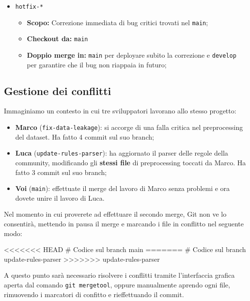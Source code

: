 \documentclass[12pt]{article}
\begin{document}
\begin{samepage}
\begin{itemize}
\begin{itemize}
\end{itemize}
\item \texttt{hotfix-*}
\begin{itemize}
\item \textbf{Scopo:} Correzione immediata di bug critici trovati nel \texttt{main};
\item \textbf{Checkout da:} \texttt{main}
\item \textbf{Doppio merge in:} \texttt{main} per deployare subito la correzione e \texttt{develop} per garantire che il bug non riappaia in futuro;
\end{itemize}
\end{itemize}
\end{samepage}

\newpage
\subsection{Gestione dei conflitti}
Immaginiamo un contesto in cui tre sviluppatori lavorano allo stesso progetto:
\begin{itemize}
\item \textbf{Marco} (\texttt{fix-data-leakage}): si accorge di una falla critica nel preprocessing del dataset. Ha fatto 4 commit sul suo branch;
\item \textbf{Luca} (\texttt{update-rules-parser}): ha aggiornato il parser delle regole della community, modificando gli \textbf{stessi file} di preprocessing toccati da Marco. Ha fatto 3 commit sul suo branch;
\item \textbf{Voi} (\texttt{main}): effettuate il merge del lavoro di Marco senza problemi e ora dovete unire il lavoro di Luca.
\end{itemize}
Nel momento in cui proverete ad effettuare il secondo merge, Git non ve lo consentirà, mettendo in pausa il merge e marcando i file in conflitto nel seguente modo:
\begin{code}
  <<<<<<< HEAD
  # Codice sul branch main
  =======
  # Codice sul branch update-rules-parser
  >>>>>>> update-rules-parser
\end{code}
A questo punto sarà necessario risolvere i conflitti tramite l'interfaccia grafica aperta dal comando \texttt{git mergetool},
oppure manualmente aprendo ogni file, rimuovendo i marcatori di confitto e rieffettuando il commit.
\end{document}

